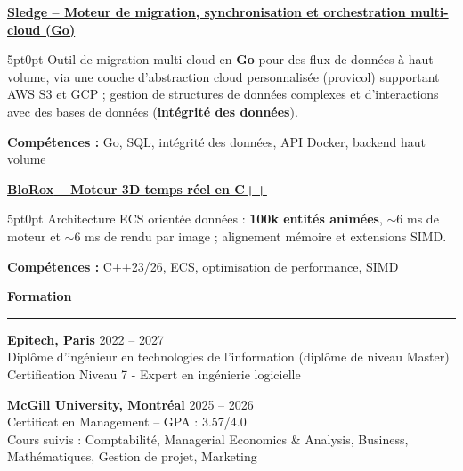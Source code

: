 \documentclass[9pt]{extarticle}
\begin{document}
\par\vspace{8pt}

\underline{\bfseries Sledge -- Moteur de migration, synchronisation et orchestration multi-cloud (Go)}
\par
\begin{adjustwidth}{5pt}{0pt}
    Outil de migration multi-cloud en {\bfseries Go} pour des flux de données à haut volume, via une couche d'abstraction cloud personnalisée ({\ttfamily provicol}) supportant AWS S3 et GCP ; gestion de structures de données complexes et d'interactions avec des bases de données ({\bfseries intégrité des données}).
\end{adjustwidth}
\par
{\bfseries Compétences :} Go, SQL, intégrité des données, API Docker, backend haut volume

\par\vspace{8pt}

\underline{\bfseries \href{https://github.com/paulogarithm/blorox}{BloRox} -- Moteur 3D temps réel en C++}
\par
\begin{adjustwidth}{5pt}{0pt}
    Architecture ECS orientée données : {\bfseries 100k entités animées}, $\sim$6 ms de moteur et $\sim$6 ms de rendu par image ; alignement mémoire et extensions SIMD.
\end{adjustwidth}
\par
{\bfseries Compétences :} C++23/26, ECS, optimisation de performance, SIMD

\par\vspace{8pt}



{\large\bfseries Formation}
\par\vspace{-8pt}
\rule{\linewidth}{0.4pt}
\par\vspace{5pt}

{\bfseries Epitech, Paris} \hfill 2022 -- 2027 \\
Diplôme d'ingénieur en technologies de l'information (diplôme de niveau Master) \\
Certification Niveau 7 - Expert en ingénierie logicielle

\vspace{6pt}

{\bfseries McGill University, Montréal} \hfill 2025 -- 2026 \\
Certificat en Management -- GPA : 3.57/4.0 \\
Cours suivis : Comptabilité, Managerial Economics \& Analysis, Business, Mathématiques, Gestion de projet, Marketing
\end{document}
